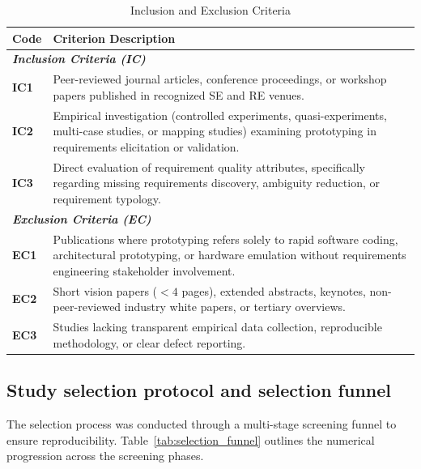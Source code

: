 \documentclass[conference]{IEEEtran}
\begin{document}
\begin{table}[htbp]
\centering
\caption{Inclusion and Exclusion Criteria}
\label{tab:inclusion_exclusion}
\begin{tabularx}{\columnwidth}{l X}
\toprule
\textbf{Code} & \textbf{Criterion Description} \\
\midrule
\multicolumn{2}{l}{\textit{\textbf{Inclusion Criteria (IC)}}} \\
\textbf{IC1} & Peer-reviewed journal articles, conference proceedings, or workshop papers published in recognized SE and RE venues. \\
\textbf{IC2} & Empirical investigation (controlled experiments, quasi-experiments, multi-case studies, or mapping studies) examining prototyping in requirements elicitation or validation. \\
\textbf{IC3} & Direct evaluation of requirement quality attributes, specifically regarding missing requirements discovery, ambiguity reduction, or requirement typology. \\
\midrule
\multicolumn{2}{l}{\textit{\textbf{Exclusion Criteria (EC)}}} \\
\textbf{EC1} & Publications where prototyping refers solely to rapid software coding, architectural prototyping, or hardware emulation without requirements engineering stakeholder involvement. \\
\textbf{EC2} & Short vision papers ($< 4$ pages), extended abstracts, keynotes, non-peer-reviewed industry white papers, or tertiary overviews. \\
\textbf{EC3} & Studies lacking transparent empirical data collection, reproducible methodology, or clear defect reporting. \\
\bottomrule
\end{tabularx}
\end{table}

\subsection{Study selection protocol and selection funnel}
The selection process was conducted through a multi-stage screening funnel to ensure reproducibility. Table~\ref{tab:selection_funnel} outlines the numerical progression across the screening phases.
\end{document}
